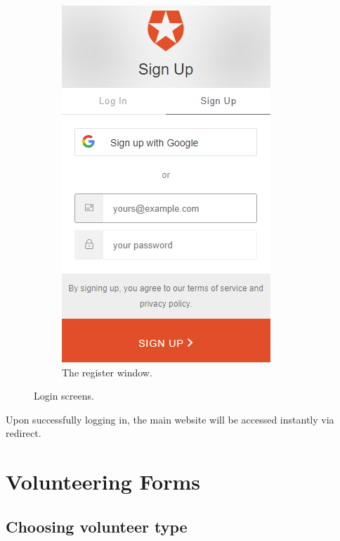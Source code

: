\documentclass[12pt]{article}
\begin{document}
\begin{figure}[h]
\begin{subfigure}{0.5\textwidth}
    \includegraphics[width=0.9\linewidth]{main/loginredirect2.png}
    \caption{The register window.}
    \label{fig4b}
    \end{subfigure}
 
\caption{Login screens.}
\label{fig4}
\end{figure}

Upon successfully logging in, the main website will be accessed instantly via redirect.
\newpage

\section{Volunteering Forms} %
\subsection{Choosing volunteer type}
\end{document}
